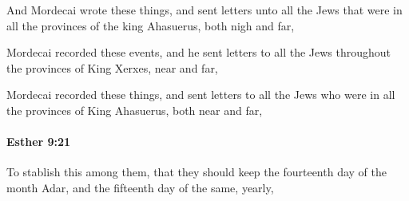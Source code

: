 			\begin{versebox}
					\item[BHS] 
					\item[LXX] 
					\item[ASV] And Mordecai wrote these things, and sent letters unto all the Jews that were in all the provinces of the king Ahasuerus, both nigh and far,
					\item[NIV] Mordecai recorded these events, and he sent letters to all the Jews throughout the provinces of King Xerxes, near and far,
					\item[NRSV] Mordecai recorded these things, and sent letters to all the Jews who were in all the provinces of King Ahasuerus, both near and far,
			\end{versebox}

		\paragraph{Esther 9:21} %
			\label{ESTHER-9-21}

			To stablish this among them, that they should keep the fourteenth day of the month Adar, and the fifteenth day of the same, yearly,


